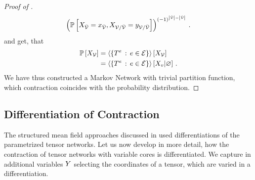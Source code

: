 \begin{proof}[Proof of ]
\begin{align*}
		\left(
			\mathbb{P}\left[X_{\bar{\mathcal{V}}}=x_{\bar{\mathcal{V}}},X_{\mathcal{V}/\bar{\mathcal{V}}}=y_{\mathcal{V}/\bar{\mathcal{V}}}\right]
		\right)^{(-1)^{\left|\tilde{\mathcal{V}}\right|-\left|\bar{\mathcal{V}}\right|}} \, .
	\end{align*}
	and get, that
	\begin{align*}
		\mathbb{P}\left[X_{\mathcal{V}}\right] & = \left\langle \{T^{e}\, : \, e\in\mathcal{E}\}\right\rangle \left[ X_{\mathcal{V}} \right] \\
		& = \left\langle \{T^{e}\, : \, e\in\mathcal{E}\}\right\rangle \left[ X_{v} | \varnothing \right] \, .
	\end{align*}
	We have thus constructed a Markov Network with trivial partition function, which contraction coincides with the probability distribution.
\end{proof}

\subsection{Differentiation of Contraction}

The structured mean field approaches discussed in  used differentiations of the parametrized tensor networks.
Let us now develop in more detail, how the contraction of tensor networks with variable cores is differentiated.
We capture in additional variables $Y$ selecting the coordinates of a tensor, which are varied in a differentiation.

